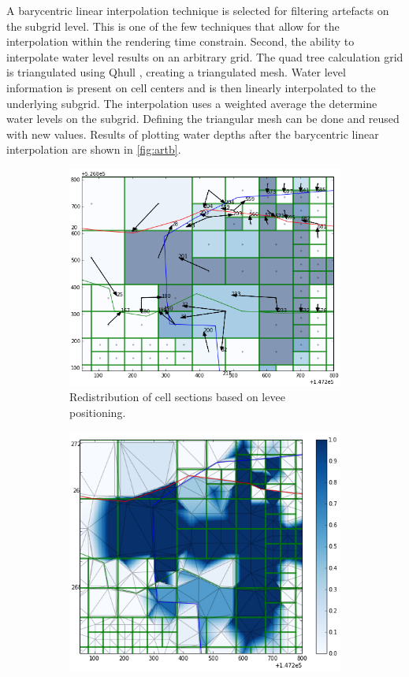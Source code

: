 \documentclass[a4paper]{article}
\begin{document}
A barycentric linear interpolation technique is selected for filtering artefacts on the subgrid level. This is one of the few techniques that allow for the interpolation within the rendering time constrain. Second, the ability to interpolate water level results on an arbitrary grid. The quad tree calculation grid is triangulated using Qhull \citep{Barber1996}, creating a triangulated mesh.  Water level information is present on cell centers and is then linearly interpolated to the underlying subgrid. The interpolation uses a weighted average the determine water levels on the subgrid. Defining the triangular mesh can be done and reused with new values.  Results of plotting water depths after the barycentric linear interpolation are shown in \autoref{fig:artb}.

\begin{figure}
  \centering
  \begin{subfigure}{0.45\textwidth}
    \includegraphics[width=1\textwidth]{levees1}
    \caption{Redistribution of cell sections based on levee positioning.}
    \label{fig:levee1}
  \end{subfigure}
  \begin{subfigure}{0.45\textwidth}
    \includegraphics[width=1\textwidth]{levees2}

\end{subfigure}
\end{figure}
\end{document}
